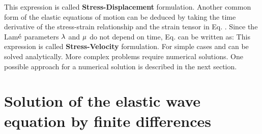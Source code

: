 This expression is called {\bf{Stress-Displacement}} formulation. Another common form of the elastic equations of motion can be deduced by taking the time derivative of the stress-strain relationship and the strain tensor in Eq. . Since the Lam$\acute{\rm e}$ parameters $\rm{\lambda}$ and $\rm{\mu}$ do not depend on time, Eq.  can be written as:
This expression is called {\bf{Stress-Velocity}} formulation. For simple cases  and  can be solved analytically. More complex problems require numerical solutions. One possible approach for a numerical solution is described in the next section.
\newpage
\section{Solution of the elastic wave equation by finite differences}\label{elastic_FD_Code}

